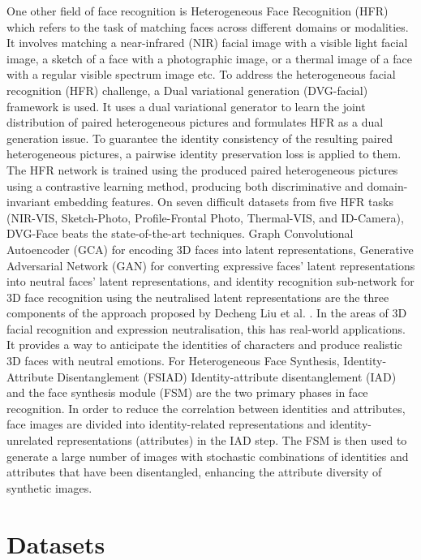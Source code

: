 One other field of face recognition is Heterogeneous Face Recognition (HFR) which refers to the task of matching faces across different domains or modalities. It involves matching a near-infrared (NIR) facial image with a visible light facial image, a sketch of a face with a photographic image, or a thermal image of a face with a regular visible spectrum image etc. To address the heterogeneous facial recognition (HFR) challenge, a Dual variational generation (DVG-facial) \cite{fu_dvg-face_2022} framework is used. It uses a dual variational generator to learn the joint distribution of paired heterogeneous pictures and formulates HFR as a dual generation issue. To guarantee the identity consistency of the resulting paired heterogeneous pictures, a pairwise identity preservation loss is applied to them. The HFR network is trained using the produced paired heterogeneous pictures using a contrastive learning method, producing both discriminative and domain-invariant embedding features. On seven difficult datasets from five HFR tasks (NIR-VIS, Sketch-Photo, Profile-Frontal Photo, Thermal-VIS, and ID-Camera), DVG-Face beats the state-of-the-art techniques.
Graph Convolutional Autoencoder (GCA) for encoding 3D faces into latent representations, Generative Adversarial Network (GAN) for converting expressive faces' latent representations into neutral faces' latent representations, and identity recognition sub-network for 3D face recognition using the neutralised latent representations are the three components of the approach proposed by Decheng Liu et al. \cite{liu_heterogeneous_2022}. In the areas of 3D facial recognition and expression neutralisation, this has real-world applications. It provides a way to anticipate the identities of characters and produce realistic 3D faces with neutral emotions.
For Heterogeneous Face Synthesis, Identity-Attribute Disentanglement (FSIAD) \cite{yang_heterogeneous_2022} Identity-attribute disentanglement (IAD) and the face synthesis module (FSM) are the two primary phases in face recognition. In order to reduce the correlation between identities and attributes, face images are divided into identity-related representations and identity-unrelated representations (attributes) in the IAD step. The FSM is then used to generate a large number of images with stochastic combinations of identities and attributes that have been disentangled, enhancing the attribute diversity of synthetic images.

\section{Datasets} \label{section:datasets}


